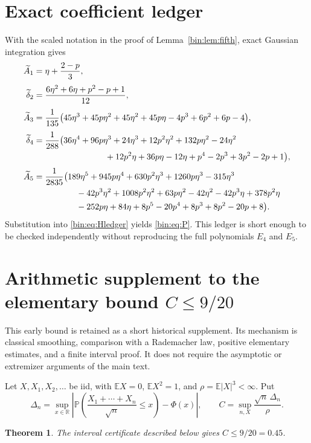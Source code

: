 \documentclass[11pt,a4paper]{article}
\numberwithin{equation}{section}
\newtheorem{theorem}{Theorem}[section]
\theoremstyle{definition}
\theoremstyle{remark}
\newcommand{\E}{\mathbb E}
\newcommand{\R}{\mathbb R}
\newcommand{\D}{\Delta_n}
\begin{document}
\section{Exact coefficient ledger}\label{bin:app:ledger}

With the scaled notation in the proof of Lemma~\ref{bin:lem:fifth}, exact
Gaussian integration gives
\begin{align*}
 \widetilde A_1={}&\eta+\frac{2-p}{3},\\[1mm]
 \widetilde\delta_2={}&
 \frac{6\eta^2+6\eta+p^2-p+1}{12},\\[1mm]
 \widetilde A_3={}&\frac1{135}
 \bigl(45\eta^3+45p\eta^2+45\eta^2+45p\eta
 -4p^3+6p^2+6p-4\bigr),\\[1mm]
 \widetilde\delta_4={}&\frac1{288}
 \bigl(36\eta^4+96p\eta^3+24\eta^3+12p^2\eta^2
 +132p\eta^2-24\eta^2\\
 &\hspace{25mm}{}+12p^2\eta+36p\eta-12\eta
 +p^4-2p^3+3p^2-2p+1\bigr),\\[1mm]
 \widetilde A_5={}&\frac1{2835}
 \bigl(189\eta^5+945p\eta^4+630p^2\eta^3+1260p\eta^3
 -315\eta^3\\
 &\hspace{13mm}{}-42p^3\eta^2+1008p^2\eta^2+63p\eta^2-42\eta^2
 -42p^3\eta+378p^2\eta\\
 &\hspace{13mm}{}-252p\eta+84\eta
 +8p^5-20p^4+8p^3+8p^2-20p+8\bigr).
\end{align*}
Substitution into \eqref{bin:eq:Hledger} yields \eqref{bin:eq:P}.  This ledger is
short enough to be checked independently without reproducing the full
polynomials $E_4$ and $E_5$.

\section{Arithmetic supplement to the elementary bound \(C\le9/20\)}\label{app:elementary045}

This early bound is retained as a short historical supplement.
Its mechanism is classical smoothing, comparison with a Rademacher law,
positive elementary estimates, and a finite interval proof.
It does not require the asymptotic or extremizer arguments of the main text.

Let \(X,X_1,X_2,\ldots\) be iid, with \(\E X=0\), \(\E X^2=1\), and
\(\rho=\E|X|^3<\infty\). Put
\[
 \D=\sup_{x\in\R}
 \left|\mathbb P\!\left(\frac{X_1+\cdots+X_n}{\sqrt n}\le x\right)
       -\Phi(x)\right|,
 \qquad C=\sup_{n,X}\frac{\sqrt n\,\D}{\rho}.
\]
\begin{theorem}\label{app:045:theorem}
The interval certificate described below gives \(C\le9/20=0.45\).
\end{theorem}
\end{document}
